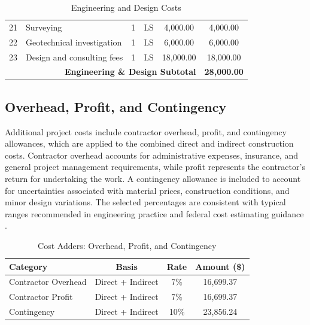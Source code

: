 \begin{table}[H]
\centering
\caption{Engineering and Design Costs}
\label{tab:engineering_costs}
\begin{tabular}{c l c c c c}
\toprule
21 & Surveying                  & 1 & LS & 4,000.00  & 4,000.00  \\
22 & Geotechnical investigation & 1 & LS & 6,000.00  & 6,000.00  \\
23 & Design and consulting fees & 1 & LS & 18,000.00 & 18,000.00 \\
\midrule
\multicolumn{5}{r}{\textbf{Engineering \& Design Subtotal}} & \textbf{28,000.00} \\
\bottomrule
\end{tabular}
\end{table}

\subsection{Overhead, Profit, and Contingency}

Additional project costs include contractor overhead, profit, and contingency allowances, which are applied to the combined direct and indirect construction costs. Contractor overhead accounts for administrative expenses, insurance, and general project management requirements, while profit represents the contractor’s return for undertaking the work. A contingency allowance is included to account for uncertainties associated with material prices, construction conditions, and minor design variations. The selected percentages are consistent with typical ranges recommended in engineering practice and federal cost estimating guidance \cite{FHWA_MajorProjectCostGuidance_2007, RSMeans_CostData_2025}.

\begin{table}[H]
\centering
\caption{Cost Adders: Overhead, Profit, and Contingency}
\label{tab:adders}
\begin{tabular}{l c c c}
\toprule
\textbf{Category} & \textbf{Basis} & \textbf{Rate} & \textbf{Amount (\$)} \\
\midrule
Contractor Overhead & Direct + Indirect & 7\%  & 16,699.37 \\
Contractor Profit   & Direct + Indirect & 7\%  & 16,699.37 \\
Contingency         & Direct + Indirect & 10\% & 23,856.24 \\
\bottomrule
\end{tabular}
\end{table}

